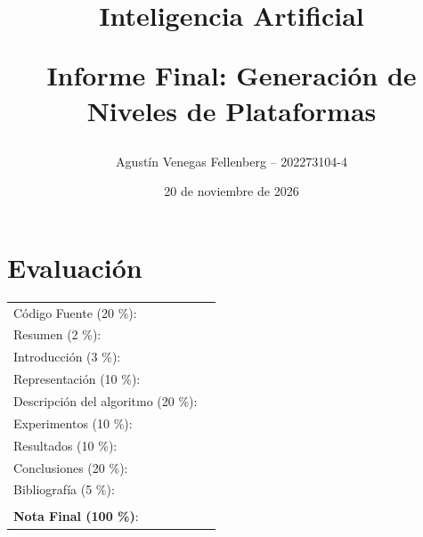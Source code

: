 \documentclass[letter, 10pt]{article}
\begin{document}
\title{Inteligencia Artificial \\ \begin{Large}Informe Final: Generaci\'on de Niveles de Plataformas\end{Large}}
\author{Agust\'in Venegas Fellenberg -- 202273104-4}
\date{20 de noviembre de 2026}
\maketitle

\section*{Evaluaci\'on}

\begin{tabular}{ll}
C\'odigo Fuente (20 \%): & \underline{\hspace{2cm}}\\
Resumen (2 \%): & \underline{\hspace{2cm}}\\
Introducci\'on (3 \%): & \underline{\hspace{2cm}}\\
Representaci\'on (10 \%): & \underline{\hspace{2cm}} \\
Descripci\'on del algoritmo (20 \%): & \underline{\hspace{2cm}} \\
Experimentos (10 \%): & \underline{\hspace{2cm}} \\
Resultados (10 \%): & \underline{\hspace{2cm}} \\
Conclusiones (20 \%): & \underline{\hspace{2cm}}\\
Bibliograf\'ia (5 \%): & \underline{\hspace{2cm}}\\
 & \\
\textbf{Nota Final (100 \%)}: & \underline{\hspace{2cm}}
\end{tabular}
\end{document}
